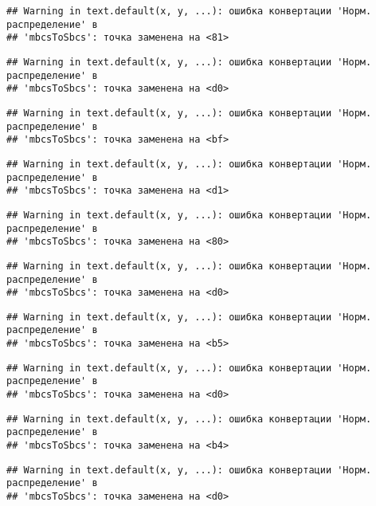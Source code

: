\documentclass[
]{article}
\begin{document}
\begin{verbatim}
## Warning in text.default(x, y, ...): ошибка конвертации 'Норм. распределение' в
## 'mbcsToSbcs': точка заменена на <81>
\end{verbatim}

\begin{verbatim}
## Warning in text.default(x, y, ...): ошибка конвертации 'Норм. распределение' в
## 'mbcsToSbcs': точка заменена на <d0>
\end{verbatim}

\begin{verbatim}
## Warning in text.default(x, y, ...): ошибка конвертации 'Норм. распределение' в
## 'mbcsToSbcs': точка заменена на <bf>
\end{verbatim}

\begin{verbatim}
## Warning in text.default(x, y, ...): ошибка конвертации 'Норм. распределение' в
## 'mbcsToSbcs': точка заменена на <d1>
\end{verbatim}

\begin{verbatim}
## Warning in text.default(x, y, ...): ошибка конвертации 'Норм. распределение' в
## 'mbcsToSbcs': точка заменена на <80>
\end{verbatim}

\begin{verbatim}
## Warning in text.default(x, y, ...): ошибка конвертации 'Норм. распределение' в
## 'mbcsToSbcs': точка заменена на <d0>
\end{verbatim}

\begin{verbatim}
## Warning in text.default(x, y, ...): ошибка конвертации 'Норм. распределение' в
## 'mbcsToSbcs': точка заменена на <b5>
\end{verbatim}

\begin{verbatim}
## Warning in text.default(x, y, ...): ошибка конвертации 'Норм. распределение' в
## 'mbcsToSbcs': точка заменена на <d0>
\end{verbatim}

\begin{verbatim}
## Warning in text.default(x, y, ...): ошибка конвертации 'Норм. распределение' в
## 'mbcsToSbcs': точка заменена на <b4>
\end{verbatim}

\begin{verbatim}
## Warning in text.default(x, y, ...): ошибка конвертации 'Норм. распределение' в
## 'mbcsToSbcs': точка заменена на <d0>
\end{verbatim}
\end{document}
